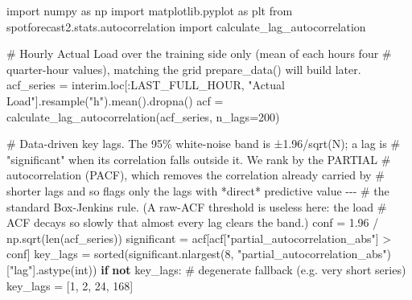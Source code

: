 \documentclass[
  english,
  letterpaper,
]{scrbook}
\newenvironment{Shaded}{\begin{snugshade}}{\end{snugshade}}
\newcommand{\BuiltInTok}[1]{\textcolor[rgb]{0.00,0.23,0.31}{#1}}
\newcommand{\CommentTok}[1]{\textcolor[rgb]{0.37,0.37,0.37}{#1}}
\newcommand{\ControlFlowTok}[1]{\textcolor[rgb]{0.00,0.23,0.31}{\textbf{#1}}}
\newcommand{\DecValTok}[1]{\textcolor[rgb]{0.68,0.00,0.00}{#1}}
\newcommand{\FloatTok}[1]{\textcolor[rgb]{0.68,0.00,0.00}{#1}}
\newcommand{\ImportTok}[1]{\textcolor[rgb]{0.00,0.46,0.62}{#1}}
\newcommand{\KeywordTok}[1]{\textcolor[rgb]{0.00,0.23,0.31}{\textbf{#1}}}
\newcommand{\NormalTok}[1]{\textcolor[rgb]{0.00,0.23,0.31}{#1}}
\newcommand{\OperatorTok}[1]{\textcolor[rgb]{0.37,0.37,0.37}{#1}}
\newcommand{\StringTok}[1]{\textcolor[rgb]{0.13,0.47,0.30}{#1}}
\begin{document}
\begin{Shaded}
\begin{Highlighting}[]
\ImportTok{import}\NormalTok{ numpy }\ImportTok{as}\NormalTok{ np}
\ImportTok{import}\NormalTok{ matplotlib.pyplot }\ImportTok{as}\NormalTok{ plt}
\ImportTok{from}\NormalTok{ spotforecast2.stats.autocorrelation }\ImportTok{import}\NormalTok{ calculate\_lag\_autocorrelation}

\CommentTok{\# Hourly Actual Load over the training side only (mean of each hour\textquotesingle{}s four}
\CommentTok{\# quarter{-}hour values), matching the grid prepare\_data() will build later.}
\NormalTok{acf\_series }\OperatorTok{=}\NormalTok{ interim.loc[:LAST\_FULL\_HOUR, }\StringTok{"Actual Load"}\NormalTok{].resample(}\StringTok{"h"}\NormalTok{).mean().dropna()}
\NormalTok{acf }\OperatorTok{=}\NormalTok{ calculate\_lag\_autocorrelation(acf\_series, n\_lags}\OperatorTok{=}\DecValTok{200}\NormalTok{)}

\CommentTok{\# Data{-}driven key lags. The 95\% white{-}noise band is ±1.96/sqrt(N); a lag is}
\CommentTok{\# "significant" when its correlation falls outside it. We rank by the PARTIAL}
\CommentTok{\# autocorrelation (PACF), which removes the correlation already carried by}
\CommentTok{\# shorter lags and so flags only the lags with *direct* predictive value {-}{-}{-}}
\CommentTok{\# the standard Box{-}Jenkins rule. (A raw{-}ACF threshold is useless here: the load}
\CommentTok{\# ACF decays so slowly that almost every lag clears the band.)}
\NormalTok{conf }\OperatorTok{=} \FloatTok{1.96} \OperatorTok{/}\NormalTok{ np.sqrt(}\BuiltInTok{len}\NormalTok{(acf\_series))}
\NormalTok{significant }\OperatorTok{=}\NormalTok{ acf[acf[}\StringTok{"partial\_autocorrelation\_abs"}\NormalTok{] }\OperatorTok{\textgreater{}}\NormalTok{ conf]}
\NormalTok{key\_lags }\OperatorTok{=} \BuiltInTok{sorted}\NormalTok{(significant.nlargest(}\DecValTok{8}\NormalTok{, }\StringTok{"partial\_autocorrelation\_abs"}\NormalTok{)[}\StringTok{"lag"}\NormalTok{].astype(}\BuiltInTok{int}\NormalTok{))}
\ControlFlowTok{if} \KeywordTok{not}\NormalTok{ key\_lags:                       }\CommentTok{\# degenerate fallback (e.g. very short series)}
\NormalTok{    key\_lags }\OperatorTok{=}\NormalTok{ [}\DecValTok{1}\NormalTok{, }\DecValTok{2}\NormalTok{, }\DecValTok{24}\NormalTok{, }\DecValTok{168}\NormalTok{]}


\end{Highlighting}
\end{Shaded}
\end{document}
